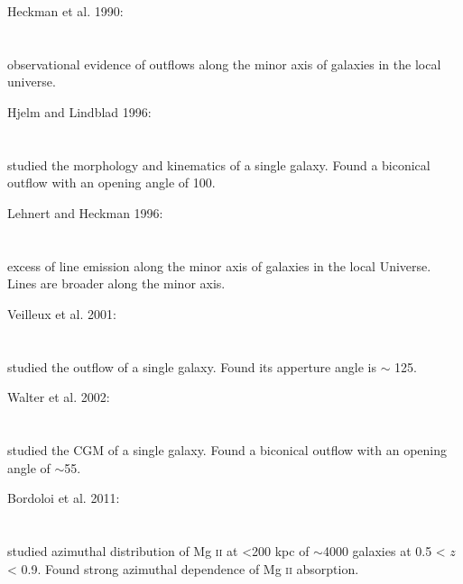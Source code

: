 Heckman et al. 1990: \\
\citet{1990ApJS...74..833H} \\
\citep{1990ApJS...74..833H} \\
observational evidence of outflows along the minor axis of galaxies in the local
universe. \\

\hline

Hjelm and Lindblad 1996: \\
\citet{1996A&A...305..727H} \\
\citep{1996A&A...305..727H} \\
studied the morphology and kinematics of a single galaxy. Found a biconical
outflow with an opening angle of 100\º. \\

\hline

Lehnert and Heckman 1996: \\
\citet{1996ApJ...462..651L} \\
\citep{1996ApJ...462..651L} \\
excess of line emission along the minor axis of galaxies in the local Universe.
Lines are broader along the minor axis. \\

\hline

Veilleux et al. 2001: \\
\citet{2001AJ....121..198V} \\
\citep{2001AJ....121..198V} \\
studied the outflow of a single galaxy. Found its apperture angle is $\sim$
125\º. \\

\hline

Walter et al. 2002: \\
\citet{2002ApJ...580L..21W} \\
\citep{2002ApJ...580L..21W} \\
studied the CGM of a single galaxy. Found a biconical outflow with an opening
angle of $\sim$55\º. \\

\hline

Bordoloi et al. 2011: \\
\citet{2011ApJ...743...10B} \\
\citep{2011ApJ...743...10B} \\
studied azimuthal distribution of Mg \textsc{ii} at <200 kpc of $\sim$4000
galaxies at 0.5 < $z$ < 0.9. Found strong azimuthal dependence of Mg \textsc{ii}
absorption. \\

